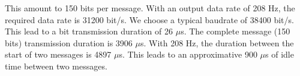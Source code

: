 This amount to 150 bits per message.
With an output data rate of 208 Hz, the required data rate is 31200 bit/s.
We choose a typical baudrate of 38400 bit/s.
This lead to a bit transmission duration of 26 $\mu$s.
The complete message (150 bits) transmission duration is 3906 $\mu$s.
With 208 Hz, the duration between the start of two messages is 4897 $\mu$s.
This leads to an approximative 900 $\mu$s of idle time between two messages.
